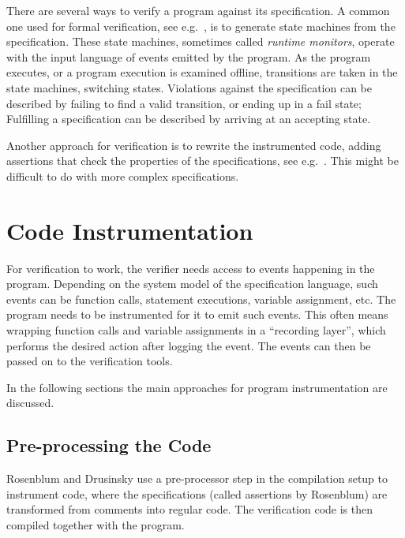 \documentclass[a4paper,11pt]{kth-mag}
\theoremstyle{definition}
\begin{document}
There are several ways to verify a program against its specification. A common
one used for formal verification, see e.g.\ \cite{bauer06monitoring,
bodden05efficientrv, jalili07rverl, barringer03eagle}, is to generate state
machines from the specification. These state machines, sometimes called
\textit{runtime monitors}, operate with the input language of events emitted by
the program. As the program executes, or a program execution is examined
offline, transitions are taken in the state machines, switching states.
Violations against the specification can be described by failing to find a
valid transition, or ending up in a fail state; Fulfilling a specification can
be described by arriving at an accepting state.

Another approach for verification is to rewrite the instrumented code, adding
assertions that check the properties of the specifications, see e.g.\
\cite{rosenblum95practicalassertions, drusinsky00temporalrover}. This might be
difficult to do with more complex specifications.


\section{Code Instrumentation} \label{section-instrumentation}

For verification to work, the verifier needs access to events happening in the
program. Depending on the system model of the specification language, such
events can be function calls, statement executions, variable assignment, etc.
The program needs to be instrumented for it to emit such events. This often
means wrapping function calls and variable assignments in a ``recording
layer'', which performs the desired action after logging the event. The events
can then be passed on to the verification tools.

In the following sections the main approaches for program instrumentation are
discussed.


\subsection{Pre-processing the Code}

Rosenblum \cite{rosenblum95practicalassertions} and Drusinsky
\cite{drusinsky00temporalrover} use a pre-processor step in the compilation
setup to instrument code, where the specifications (called assertions by
Rosenblum) are transformed from comments into regular code. The verification
code is then compiled together with the program.
\end{document}
